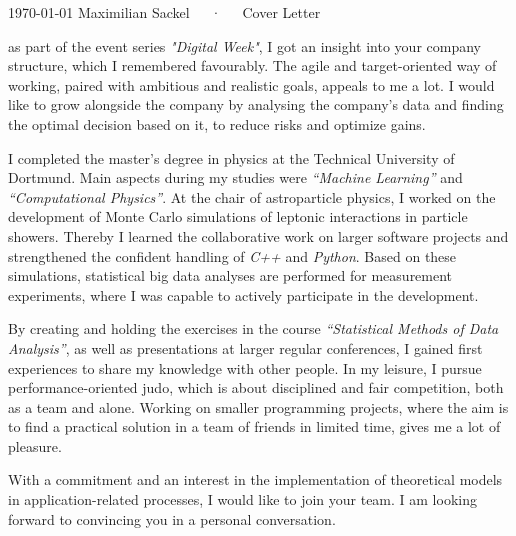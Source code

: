 \documentclass[11pt, a4paper]{Awesome-CV/awesome-cv}
\begin{document}
\makecvheader[R]

\makecvfooter
{\today}
{Maximilian Sackel~~~·~~~Cover Letter}
{}

\makelettertitle

\begin{cvletter}
    as part of the event series \textit{"Digital Week"}, I got an insight into your company structure,
    which I remembered favourably.
    The agile and target-oriented way of working,
    paired with ambitious and realistic goals,
    appeals to me a lot.
    I would like to grow alongside the company by analysing the company's data
    and finding the optimal decision based on it, to reduce risks and optimize gains.

    I completed the master's degree in physics at the Technical University of Dortmund.
    Main aspects during my studies were \textit{``Machine Learning''} and \textit{``Computational Physics''}.
    At the chair of astroparticle physics, I worked on the development of Monte Carlo simulations of leptonic interactions in particle showers.
    Thereby I learned the collaborative work on larger software projects and strengthened the confident handling of \textit{C++} and \textit{Python}.
    Based on these simulations, statistical big data analyses are performed for measurement experiments,
    where I was capable to actively participate in the development.

    By creating and holding the exercises in the course
    \textit{``Statistical Methods of Data Analysis''}, as well as
    presentations at larger regular conferences,
    I gained first experiences to share my knowledge with other people.
    In my leisure, I pursue performance-oriented judo, which is about disciplined and fair competition, both as a team and alone.
    Working on smaller programming projects, where the aim is to find a
    practical solution in a team of friends in limited time, gives me a lot of
    pleasure.

    With a commitment and an interest in the implementation of
    theoretical models in application-related processes, I would like to join
    your team.
    I am looking forward to convincing you in a personal conversation.

\end{cvletter}


\makeletterclosing
\end{document}
